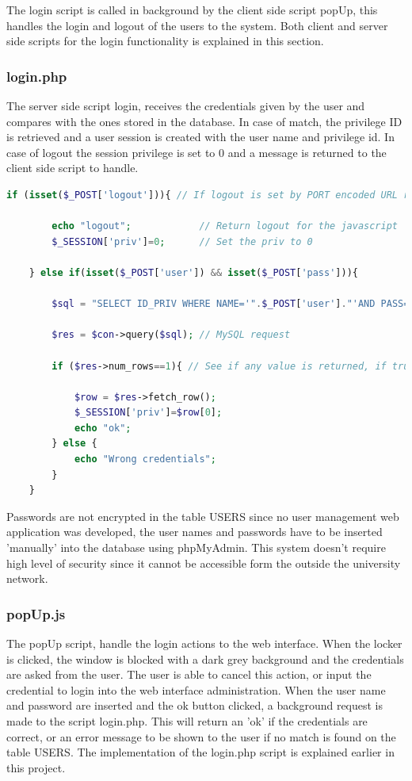 The login script is called in background by the client side script popUp, this handles the login and logout of the users to the system. Both client and server side scripts for the login functionality is explained in this section.

\subsubsection{login.php}The server side script login, receives the credentials given by the user and compares with the ones stored in the database. In case of match, the privilege ID is retrieved and a user session is created with the user name and privilege id. In case of logout the session privilege is set to 0 and a message is returned to the client side script to handle.
\begin{lstlisting}[language=php]
	if (isset($_POST['logout'])){ // If logout is set by PORT encoded URL request
		
		echo "logout";			  // Return logout for the javascript
		$_SESSION['priv']=0;	  // Set the priv to 0
		
	} else if(isset($_POST['user']) && isset($_POST['pass'])){
		
		$sql = "SELECT ID_PRIV WHERE NAME='".$_POST['user']."'AND PASS='".$_POST['pass']."'"; // SQL statment contruction (No encryption in password)
		
		$res = $con->query($sql); // MySQL request

		if ($res->num_rows==1){ // See if any value is returned, if true assign privelege to session priv.
			
			$row = $res->fetch_row();	
			$_SESSION['priv']=$row[0];
			echo "ok";
		} else {
			echo "Wrong credentials";
		}
	}
\end{lstlisting}

Passwords are not encrypted in the table USERS since no user management web application was developed, the user names and passwords have to be inserted 'manually' into the database using phpMyAdmin. This system doesn't require high level of security since it cannot be accessible form the outside the university network.

\subsubsection{popUp.js}
The popUp script, handle the login actions to the web interface. When the locker is clicked, the window is blocked with a dark grey background and the credentials are asked from the user. The user is able to cancel this action, or input the credential to login into the web interface administration. When the user name and password are inserted and the ok button clicked, a background request is made to the script login.php. This will return an 'ok' if the credentials are correct, or an error message to be shown to the user if no match is found on the table USERS. The implementation of the login.php script is explained earlier in this project.

